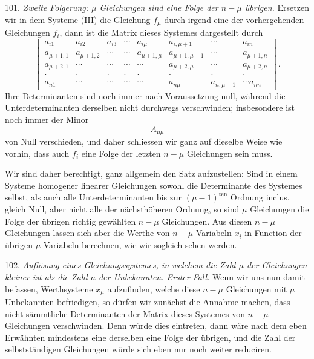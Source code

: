 \documentclass[11pt]{article}
\providecommand{\weq}[2]{\begin{equation}\tag{#1}#2\end{equation}}
\begin{document}
101. \textit{Zweite Folgerung: $\mu$ Gleichungen sind eine Folge der
$n - \mu$ \"ubrigen.} Ersetzen wir in dem Systeme (III) die Gleichung
$f_\mu$ durch irgend eine der vorhergehenden Gleichungen $f_i$, dann ist
die Matrix dieses Systemes dargestellt durch
\weq{B}{
\begin{vmatrix}
a_{i1} & a_{i2} & a_{i3} & \cdots & a_{i\mu} & a_{i,\mu+1} & \cdots & a_{in} \\
a_{\mu+1,1} & a_{\mu+1,2} & \cdots & \cdots & a_{\mu+1,\mu} & a_{\mu+1,\mu+1} & \cdots & a_{\mu+1,n} \\
a_{\mu+2,1} & \cdots & \cdots & \cdots & \cdots & a_{\mu+2,\mu} & \cdots & a_{\mu+2,n} \\
\cdot & \cdot & \cdot & \cdot & \cdot & \cdot & \cdot & \cdot \\
a_{n1} & \cdots & \cdots & \cdots & \cdots & a_{n\mu} & a_{n,\mu+1} & \cdots a_{nn}
\end{vmatrix}.
}
Ihre Determinanten sind noch immer nach Voraussetzung null, w\"ahrend die
Unterdeterminanten derselben nicht durchwegs verschwinden; insbesondere
ist noch immer der Minor
\[
A_{\mu\mu}
\]
von Null verschieden, und daher schliessen wir ganz auf dieselbe Weise
wie vorhin, dass auch $f_i$ eine Folge der letzten $n - \mu$ Gleichungen
sein muss.

Wir sind daher berechtigt, ganz allgemein den Satz aufzustellen:
\glqq Sind in einem Systeme homogener linearer Gleichungen sowohl die
Determinante des Systemes selbst, als auch alle Unterdeterminanten bis
zur $(\mu - 1)^{\mathrm{ten}}$ Ordnung inclus. gleich Null, aber nicht
alle der n\"achsth\"oheren Ordnung, so sind $\mu$ Gleichungen die Folge
der \"ubrigen richtig gew\"ahlten $n - \mu$ Gleichungen.\grqq{}
Aus diesen $n - \mu$ Gleichungen lassen sich aber die Werthe von
$n - \mu$ Variabeln $x_i$ in Function der \"ubrigen $\mu$ Variabeln
berechnen, wie wir sogleich sehen werden.

102. \textit{Aufl\"osung eines Gleichungssystemes, in welchem die Zahl
$\mu$ der Gleichungen kleiner ist als die Zahl $n$ der Unbekannten. Erster
Fall.} Wenn wir uns nun damit befassen, Werthsysteme $x_\mu$ aufzufinden,
welche diese $n - \mu$ Gleichungen mit $\mu$ Unbekannten befriedigen, so
d\"urfen wir zun\"achst die Annahme machen, dass nicht s\"ammtliche
Determinanten der Matrix dieses Systemes von $n - \mu$ Gleichungen
verschwinden. Denn w\"urde dies eintreten, dann w\"are nach dem eben
Erw\"ahnten mindestens eine derselben eine Folge der \"ubrigen, und die
Zahl der selbstst\"andigen Gleichungen w\"urde sich eben nur noch weiter
reduciren.
\end{document}
